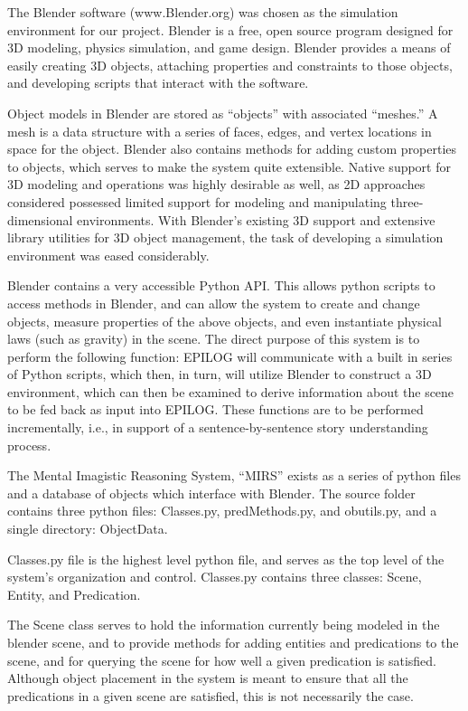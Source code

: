 The Blender software (www.Blender.org) was chosen as the simulation environment for our project. Blender is a free, open source program designed for 3D modeling, physics simulation, and game design. Blender provides a means of easily creating 3D objects, attaching properties and constraints to those objects, and developing scripts that interact with the software.

Object models in Blender are stored as “objects” with associated “meshes.” A mesh is a data structure with a series of faces, edges, and vertex locations in space for the object. Blender also contains methods for adding custom properties to objects, which serves to make the system quite extensible. Native support for 3D modeling and operations was highly desirable as well, as 2D approaches considered possessed limited support for modeling and manipulating three-dimensional environments. With Blender’s existing 3D support and extensive library utilities for 3D object management, the task of developing a simulation environment was eased considerably.

Blender contains a very accessible Python API. This allows python scripts to access methods in Blender, and can allow the system to create and change objects, measure properties of the above objects, and even instantiate physical laws (such as gravity) in the scene. The direct purpose of this system is to perform the following function: EPILOG will communicate with a built in series of Python scripts, which then, in turn, will utilize Blender to construct a 3D environment, which can then be examined to derive information about the scene to be fed back as input into EPILOG. These functions are to be performed incrementally, i.e., in support of a sentence-by-sentence story understanding process. 

The Mental Imagistic Reasoning System, “MIRS” exists as a series of python files and a database of objects which interface with Blender. The source folder contains three python files: Classes.py, predMethods.py, and obutils.py, and a single directory: ObjectData.

Classes.py file is the highest level python file, and serves as the top level of the system’s organization and control. Classes.py contains three classes: Scene, Entity, and Predication. 
	
The Scene class serves to hold the information currently being modeled in the blender scene, and to provide methods for adding entities and predications to the scene, and for querying the scene for how well a given predication is satisfied. Although object placement in the system is meant to ensure that all the predications in a given scene are satisfied, this is not necessarily the case.
	
